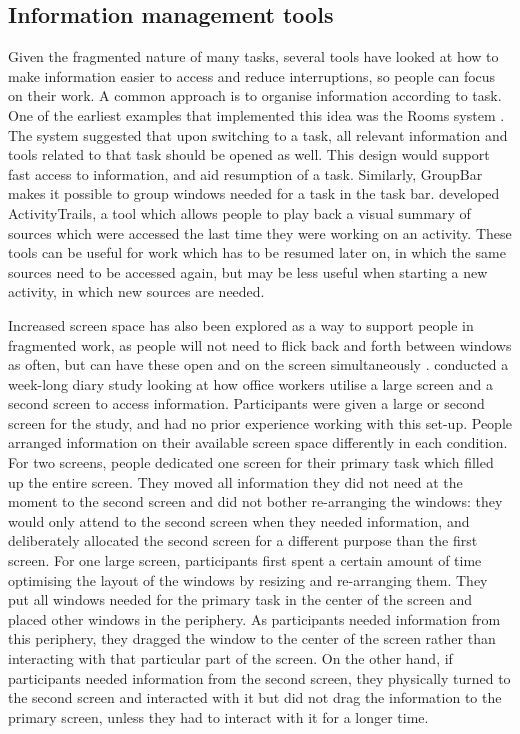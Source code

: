 \subsection{Information management tools}
Given the fragmented nature of many tasks, several tools have looked at how to make information easier to access and reduce interruptions, so people can focus on their work. A common approach is to organise information according to task. One of the earliest examples that implemented this idea was the Rooms system \citep{Card1987}. The system suggested that upon switching to a task, all relevant information and tools related to that task should be opened as well. This design would support fast access to information, and aid resumption of a task. Similarly, GroupBar \citep{Smith2003} makes it possible to group windows needed for a task in the task bar. \citet{Cangiano2009} developed ActivityTrails, a tool which allows people to play back a visual summary of sources which were accessed the last time they were working on an activity.  These tools can be useful for work which has to be resumed later on, in which the same sources need to be accessed again, but may be less useful when starting a new activity, in which new sources are needed.

Increased screen space has also been explored as a way to support people in fragmented work, as people will not need to flick back and forth between windows as often, but can have these open and on the screen simultaneously \citep{Czerwinski2003}.  \citet{Bi2009} conducted a week-long diary study looking at how office workers utilise a large screen and a second screen to access information. Participants were given a large or second screen for the study, and had no prior experience working with this set-up. People arranged information on their available screen space differently in each condition. For two screens, people dedicated one screen for their primary task which filled up the entire screen. They moved all information they did not need at the moment to the second screen and did not bother re-arranging the windows: they would only attend to the second screen when they needed information, and deliberately allocated the second screen for a different purpose than the first screen. For one large screen, participants first spent a certain amount of time optimising the layout of the windows by resizing and re-arranging them. They put all windows needed for the primary task in the center of the screen and placed other windows in the periphery.  As participants needed information from this periphery, they dragged the window to the center of the screen rather than interacting with that particular part of the screen. On the other hand, if participants needed information from the second screen, they physically turned to the second screen and interacted with it but did not drag the information to the primary screen, unless they had to interact with it for a longer time.

